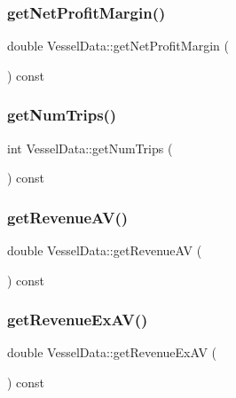 \mbox{\label{class_vessel_data_ac3f7b4c07e9a80880a87ff323b8139b8}} 
\subsubsection{\texorpdfstring{getNetProfitMargin()}{getNetProfitMargin()}}
{\footnotesize\ttfamily double Vessel\+Data\+::get\+Net\+Profit\+Margin (\begin{DoxyParamCaption}{ }\end{DoxyParamCaption}) const}

\mbox{\label{class_vessel_data_a06c8abf592fe0cb371e00b52f2304cb6}} 
\subsubsection{\texorpdfstring{getNumTrips()}{getNumTrips()}}
{\footnotesize\ttfamily int Vessel\+Data\+::get\+Num\+Trips (\begin{DoxyParamCaption}{ }\end{DoxyParamCaption}) const}

\mbox{\label{class_vessel_data_aaee49878d727a62ffa75a4b428977126}} 
\subsubsection{\texorpdfstring{getRevenueAV()}{getRevenueAV()}}
{\footnotesize\ttfamily double Vessel\+Data\+::get\+Revenue\+AV (\begin{DoxyParamCaption}{ }\end{DoxyParamCaption}) const}

\mbox{\label{class_vessel_data_aac6c29044a2c779fc9812160f76fa8c4}} 
\subsubsection{\texorpdfstring{getRevenueExAV()}{getRevenueExAV()}}
{\footnotesize\ttfamily double Vessel\+Data\+::get\+Revenue\+Ex\+AV (\begin{DoxyParamCaption}{ }\end{DoxyParamCaption}) const}

